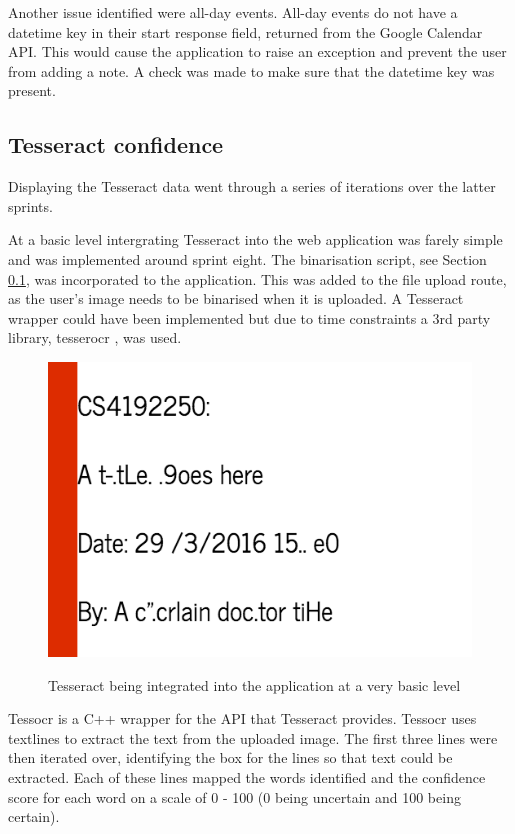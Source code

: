 {{{{{{Another issue identified were all-day events. All-day events do not have a datetime key in their start response field, returned from the Google Calendar API. This would cause the application to raise an exception and prevent the user from adding a note. A check was made to make sure that the datetime key was present.

\subsection{Tesseract confidence}
Displaying the Tesseract data went through a series of iterations over the latter sprints.

At a basic level intergrating Tesseract into the web application was farely simple and was implemented around sprint eight. The binarisation script, see Section \ref{}, was incorporated to the application. This was added to the file upload route, as the user's image needs to be binarised when it is uploaded. A Tesseract wrapper could have been implemented but due to time constraints a 3rd party library, tesserocr \cite{citeulike:14021437}, was used.

\begin{figure}[H]
  \centering
  \includegraphics{images/tesseract_first}
  \label{fig:tesseract_output}
  \caption{Tesseract being integrated into the application at a very basic level}
\end{figure}

Tessocr is a C++ wrapper for the API that Tesseract provides. Tessocr uses textlines to extract the text from the uploaded image. The first three lines were then iterated over, identifying the box for the lines so that text could be extracted. Each of these lines mapped the words identified and the confidence score for each word on a scale of 0 - 100 (0 being uncertain and 100 being certain).

}}}}}}
